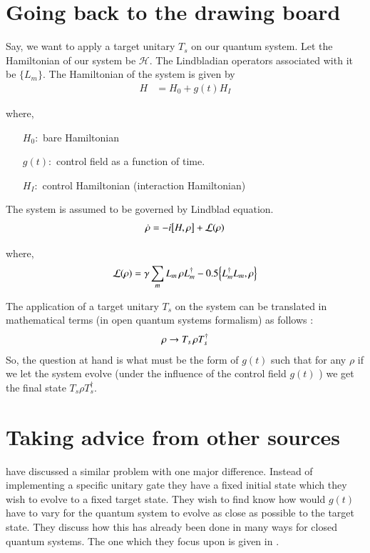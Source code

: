    

\section{Going back to the drawing board}
 Say, we want to apply a target unitary $T_{s} $ on our quantum system. Let the Hamiltonian of our system be $\mathcal{H} $. The Lindbladian operators associated with it be $\{ L_{m} \}$. The Hamiltonian of the system is given by 
\begin{align}\label{Hamiltonian form}
    H &= H_{0} + g(t) H_{I} 
\end{align}

where,
\begin{enumerate}
    \item[$H_{0} :$] bare Hamiltonian
    \item[$ g(t) :$] control field as a function of time.
    \item[$ H _{ I} :$] control Hamiltonian (interaction Hamiltonian)
\end{enumerate}

The system is assumed to be governed by Lindblad equation.
\begin{align}
    \dot{\rho} = - i\comm{H}{\rho} + \mathcal{L}(\rho)
\end{align}

where,
\[
 \mathcal{L}(\rho) = \gamma\sum_{m} L_{m}\thinspace \rho L_{m}^{\dagger} - 0.5 \anticommutator{L_{m}^{\dagger}L_{m}}{ \rho}
\]

The application of a target unitary $T_{s} $ on the system can be translated in mathematical terms (in open quantum systems formalism) as follows :
\[
 \rho \rightarrow T_{s}\thinspace  \rho T_{s} ^{\dagger}
\]
So, the question at hand is what must be the form of $ g (t)$
 such that for any $\rho $ if we let the system evolve (under the influence of the  control field  $g (t) $ ) we get the final state $T_{s} \rho  T_{s} ^{\dagger}$.

\section{Taking advice from other sources}
\cite{2018EPJST.227..203S} have  discussed a similar problem with one major difference. Instead of implementing a specific unitary gate they have a fixed initial state which they wish to evolve to a fixed target state.  They wish to find know how would $ g(t)$ have to vary for the quantum system to evolve as close as possible to the target state. They discuss how this has already been done in many ways for closed quantum systems. The one which they focus upon is given in \cite{2012JChPh.136j4103R}.


